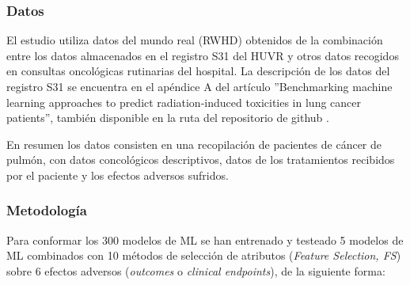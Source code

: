 \subsubsection{Datos}

El estudio utiliza datos del mundo real (RWHD) obtenidos de la combinación entre los datos almacenados en el registro S31 del HUVR y otros datos recogidos en consultas oncológicas rutinarias del hospital. La descripción de los datos del registro S31 se encuentra en el apéndice A del artículo ''Benchmarking machine learning approaches to predict radiation-induced toxicities in lung cancer patients'', también disponible en la ruta del repositorio de github .

En resumen los datos consisten en una recopilación de pacientes de cáncer de pulmón, con datos concológicos descriptivos, datos de los tratamientos recibidos por el paciente  y los efectos adversos sufridos.

\subsubsection{Metodología}

Para conformar los 300 modelos de ML se han entrenado y testeado 5 modelos de ML combinados con 10 métodos de selección de atributos (\textit{Feature Selection, FS}) sobre 6 efectos adversos (\textit{outcomes} o \textit{clinical endpoints}), de la siguiente forma: 

